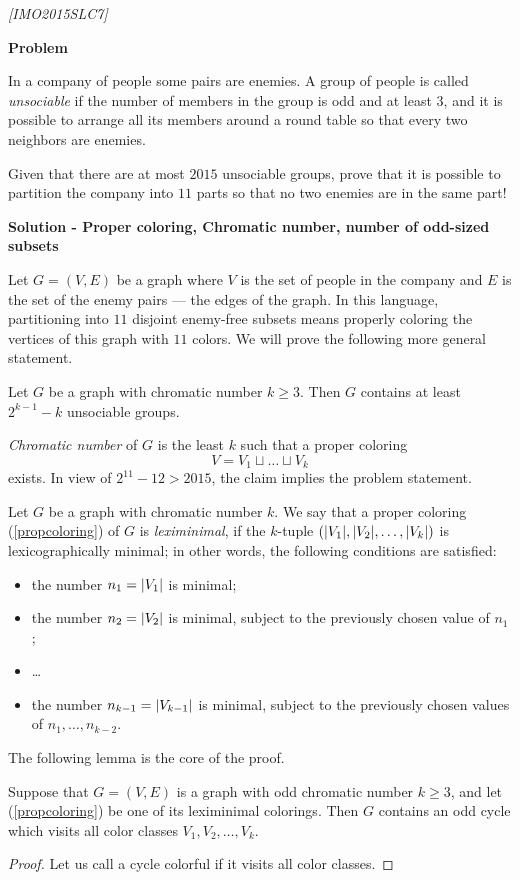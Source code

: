 \begin{problem}
\textit{[IMO2015SLC7]}

\textbf{Problem}


In a company of people some pairs are enemies. A group of people is called \textit{unsociable} if the number of members in the group is odd and at least $3$, and it is possible to arrange all its members around a round table so that every two neighbors are enemies. 

Given that there are at most $2015$ unsociable groups, prove that it is possible to partition the company into $11$ parts so that no two enemies are in the same part!

\textbf{Solution - Proper coloring, Chromatic number, number of odd-sized subsets}

Let $G = (V, E)$ be a graph where $V$ is the set of people in the company and $E$ is the set of the enemy pairs — the edges of the graph. In this language, partitioning into $11$ disjoint enemy-free subsets means properly coloring the vertices of this graph with $11$ colors. We will prove the following more general statement.

\begin{claim} Let $G$ be a graph with chromatic number $k \geq  3$. Then $G$ contains at least $2^{k-1} - k$ unsociable groups.
\end{claim}

\textit{Chromatic number} of $G$ is the least $k$ such that a proper coloring 
\begin{equation}
\label{propcoloring}
V = V_1 \sqcup \dots \sqcup V_k
\end{equation}
exists. In view of $2^{11} - 12 > 2015$, the claim implies the problem statement. 

Let $G$ be a graph with chromatic number $k$. We say that a proper coloring (\ref{propcoloring}) of $G$ is \textit{leximinimal}, if the $k$-tuple $(\lvert V_1\rvert, \lvert V_2\rvert, \dots , \lvert V_k\rvert)$ is lexicographically minimal; in other words, the following conditions are satisfied: 
\begin{itemize}
\item the number $n_1 = \lvert V_1\rvert$ is minimal; 
\item the number $n_2 = \lvert V_2\rvert$ is
minimal, subject to the previously chosen value of $n_1$; 
\item \dots  
\item the number $n_{k-1}  = \lvert V_{k-1}\rvert$ is minimal,
subject to the previously chosen values of $n_1, \dots , n_{k-2}$.
\end{itemize}
The following lemma is the core of the proof.
\begin{lemma}
\label{leximinlemma} 
Suppose that $G = (V, E)$ is a graph with odd chromatic number $k \ge 3$, and let (\ref{propcoloring}) be one of its leximinimal colorings. Then $G$ contains an odd cycle which visits all color classes
$V_1, V_2, \dots, V_k$.
\end{lemma}
\begin{proof}
Let us call a cycle colorful if it visits all color classes. 


\end{proof}
\end{problem}
